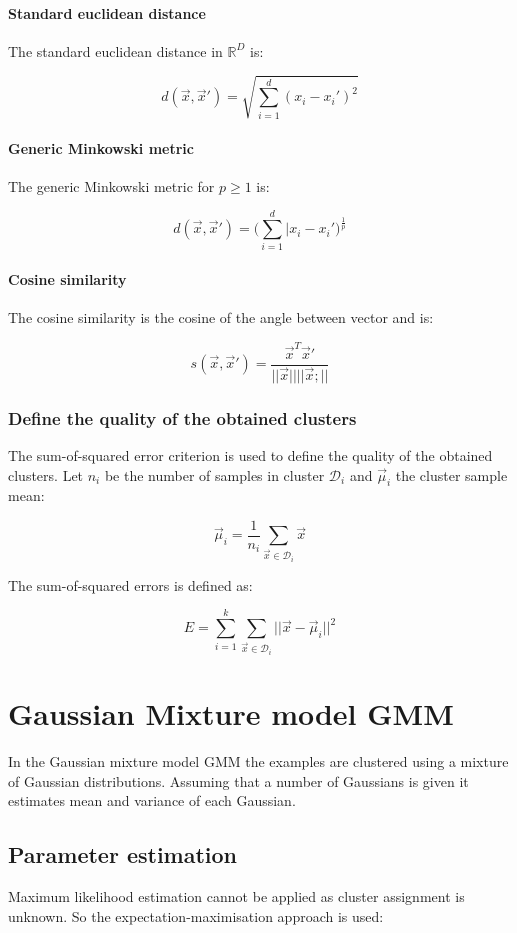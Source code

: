 			\paragraph{Standard euclidean distance}
			The standard euclidean distance in $\mathbb{R}^D$ is:

			$$d(\vec{x},\vec{x}') = \sqrt{\sum\limits_{i=1}^d(x_i-x_i')^2}$$

			\paragraph{Generic Minkowski metric}
			The generic Minkowski metric for $p\ge 1$ is:

			$$d(\vec{x},\vec{x}') = \biggl(\sum\limits_{i=1}^d|x_i-x_i'\biggr)^\frac{1}{p}$$

			\paragraph{Cosine similarity}
			The cosine similarity is the cosine of the angle between vector and is:

			$$s(\vec{x},\vec{x}') = \frac{\vec{x}^T\vec{x}'}{||\vec{x}||||\vec{x};||}$$

		\subsubsection{Define the quality of the obtained clusters}
		The sum-of-squared error criterion is used to define the quality of the obtained clusters.
		Let $n_i$ be the number of samples in cluster $\mathcal{D}_i$ and $\vec{\mu}_i$ the cluster sample mean:

		$$\vec{\mu}_i = \frac{1}{n_i}\sum\limits_{\vec{x}\in\mathcal{D}_i}\vec{x}$$

		The sum-of-squared errors is defined as:

		$$E = \sum\limits_{i=1}^k\sum\limits_{\vec{x}\in\mathcal{D}_i}||\vec{x}-\vec{\mu}_i||^2$$

\section{Gaussian Mixture model GMM}
In the Gaussian mixture model GMM the examples are clustered using a mixture of Gaussian distributions.
Assuming that a number of Gaussians is given it estimates mean and variance of each Gaussian.

	\subsection{Parameter estimation}
	Maximum likelihood estimation cannot be applied as cluster assignment is unknown.
	So the expectation-maximisation approach is used:

